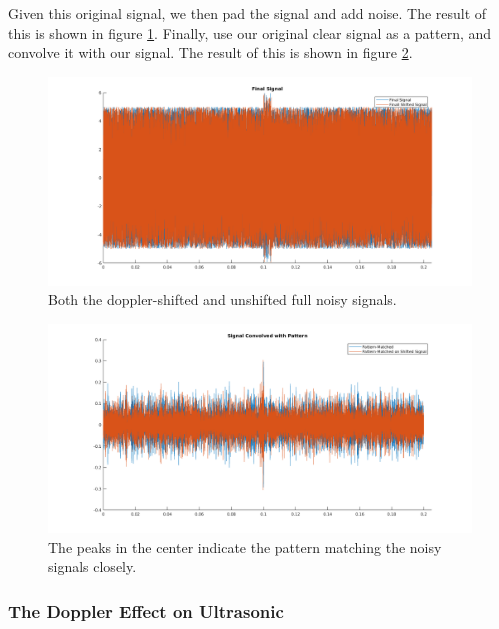 \documentclass{article}
\begin{document}
    Given this original signal, we then pad the signal and add noise. The result of this is shown in figure \ref{fig:repeated_signal}. Finally, use our original clear signal as a pattern, and convolve it with our signal. The result of this is shown in figure \ref{fig:pattern_matching}.

    \begin{figure}
      \centering
      \includegraphics[width=1\linewidth]{./images/repeated_noisy_signal.png}
      \caption{Both the doppler-shifted and unshifted full noisy signals.}
      \label{fig:repeated_signal}
    \end{figure}

    \begin{figure}
      \centering
      \includegraphics[width=1\linewidth]{./images/pattern_matching.png}
      \caption{The peaks in the center indicate the pattern matching the noisy signals closely.}
      \label{fig:pattern_matching}
    \end{figure}

    \subsubsection{The Doppler Effect on Ultrasonic}
\end{document}
